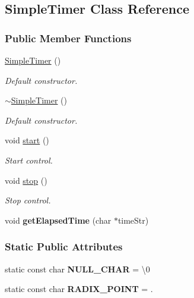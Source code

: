 \hypertarget{class_simple_timer}{}\subsection{Simple\+Timer Class Reference}
\label{class_simple_timer}
\subsubsection*{Public Member Functions}
\begin{DoxyCompactItemize}
\item 
\hyperlink{class_simple_timer_af0c18d77bcd3a28f41fb09b3f1358543}{Simple\+Timer} ()
\begin{DoxyCompactList}\small\item\em Default constructor. \end{DoxyCompactList}\item 
\hyperlink{class_simple_timer_ad29e9a56c18bb1e378b0bd125e50c62a}{$\sim$\+Simple\+Timer} ()
\begin{DoxyCompactList}\small\item\em Default constructor. \end{DoxyCompactList}\item 
void \hyperlink{class_simple_timer_afa298cf96261fc9d9af0d6ea8ece2ae6}{start} ()
\begin{DoxyCompactList}\small\item\em Start control. \end{DoxyCompactList}\item 
void \hyperlink{class_simple_timer_a07a7dbb801e7f805f7777fdf8f3ef108}{stop} ()
\begin{DoxyCompactList}\small\item\em Stop control. \end{DoxyCompactList}\item 
\hypertarget{class_simple_timer_a0ffb684ba659cde3c056fdcaf98215df}{}void {\bfseries get\+Elapsed\+Time} (char $\ast$time\+Str)\label{class_simple_timer_a0ffb684ba659cde3c056fdcaf98215df}

\end{DoxyCompactItemize}
\subsubsection*{Static Public Attributes}
\begin{DoxyCompactItemize}
\item 
\hypertarget{class_simple_timer_a647f94abb82363c9bf3fdcbe9f3c4df6}{}static const char {\bfseries N\+U\+L\+L\+\_\+\+C\+H\+A\+R} = \textquotesingle{}\textbackslash{}0\textquotesingle{}\label{class_simple_timer_a647f94abb82363c9bf3fdcbe9f3c4df6}

\item 
\hypertarget{class_simple_timer_a2036ce4a7884555b87d64238ea14800c}{}static const char {\bfseries R\+A\+D\+I\+X\+\_\+\+P\+O\+I\+N\+T} = \textquotesingle{}.\textquotesingle{}\label{class_simple_timer_a2036ce4a7884555b87d64238ea14800c}

\end{DoxyCompactItemize}
